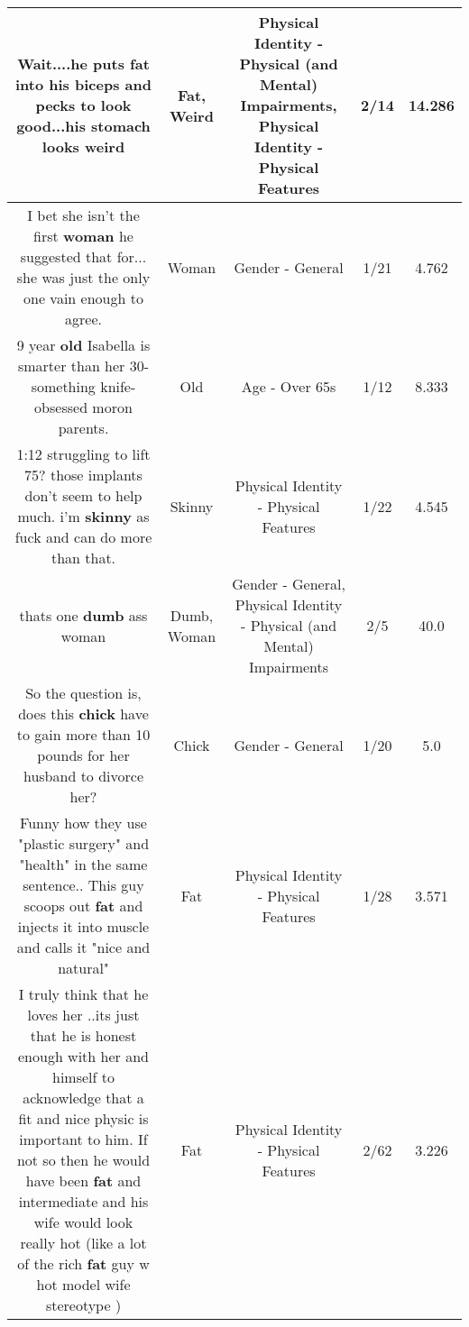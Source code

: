 \documentclass[11pt]{article}
\newlength\mylength
\begin{document}
\begin{center}
\begin{longtable}{|C{.65\mylength}|C{.30\mylength}|C{.12\mylength}|C{.12\mylength}|C{.12\mylength}|}
  \small Wait....he puts \textbf{fat} into his biceps and pecks to look good...his stomach looks weird\normalsize   & Fat, Weird & Physical Identity - Physical (and Mental) Impairments, Physical Identity - Physical Features & 2/14 & 14.286 \\  \hline
  \small I bet she isn't the first \textbf{woman} he suggested that for... she was just the only one vain enough to agree.\normalsize   & Woman & Gender - General & 1/21 & 4.762 \\  \hline
  \small 9 year \textbf{old} Isabella is smarter than her 30-something knife-obsessed moron parents.\normalsize   & Old & Age - Over 65s & 1/12 & 8.333 \\  \hline
  \small 1:12 struggling to lift 75? those implants don't seem to help much. i'm \textbf{skinny} as fuck and can do more than that.\normalsize   & Skinny & Physical Identity - Physical Features & 1/22 & 4.545 \\  \hline
  \small thats one \textbf{dumb} ass woman\normalsize   & Dumb, Woman & Gender - General, Physical Identity - Physical (and Mental) Impairments & 2/5 & 40.0 \\  \hline
  \small So the question is, does this \textbf{chick} have to gain more than 10 pounds for her husband to divorce her?\normalsize   & Chick & Gender - General & 1/20 & 5.0 \\  \hline
  \small Funny how they use "plastic surgery" and "health" in the same sentence.. This guy scoops out \textbf{fat} and injects it into muscle and calls it "nice and natural"\normalsize   & Fat & Physical Identity - Physical Features & 1/28 & 3.571 \\  \hline
  \small I truly think that he loves her ..its just that he is honest enough with her and himself to acknowledge that a fit and nice physic is important to him. If not so then he would have been \textbf{fat} and intermediate and his wife would look really hot (like a lot of the rich \textbf{fat} guy w hot model wife stereotype )\normalsize   & Fat & Physical Identity - Physical Features & 2/62 & 3.226 \\  \hline

\end{longtable}
\end{center}
\end{document}
